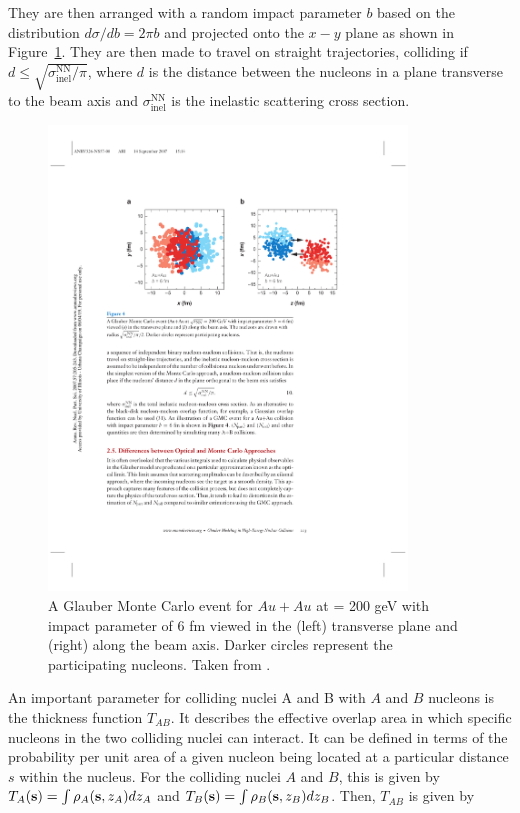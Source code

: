 They are then arranged with a random impact parameter $b$ based on the distribution $d\sigma/d b = 2\pi b$ and projected onto the $x-y$ plane
as shown in Figure~\ref{fig:glauberMC}. They are then made to travel on straight trajectories, colliding if $d \leq \sqrt{\sigma_{\mathrm{inel}}^{\mathrm{NN}}/ \pi}$,
where $d$ is the distance between the nucleons in a plane transverse to the beam axis and $\sigma_{\mathrm{inel}}^{\mathrm{NN}}$ is the inelastic
scattering cross section. \cite{doi:10.1146/annurev.nucl.57.090506.123020, Alver:2008aq}

\begin{figure}[htbp]
\begin{center}
\includegraphics[width=0.85\textwidth]{figures/theory/glauberMC}
\caption{A Glauber Monte Carlo event for $Au+Au$ at \sqrtsnn = 200 geV with impact parameter of 6 fm viewed in the (left) transverse plane and (right) along the beam axis. Darker circles represent the participating nucleons. Taken from \cite{doi:10.1146/annurev.nucl.57.090506.123020}. }
\label{fig:glauberMC}
\end{center}
\end{figure}



An important parameter for colliding nuclei A and B with $A$ and $B$ nucleons is the thickness function $T_{AB}$. It describes the effective overlap
area in which specific nucleons in the two colliding nuclei can interact. It can be defined in terms of the probability per unit area of a given nucleon
being located at a particular distance $s$ within the nucleus. For the colliding nuclei $A$ and $B$, this is given by $T_{A}({\bf{s}}) = \int \rho_A ({\bf{s}}, z_A) dz_{A}$ and $T_{B}({\bf{s}}) = \int \rho_B ({\bf{s}}, z_B) dz_{B}$. Then, $T_{AB}$ is given by

